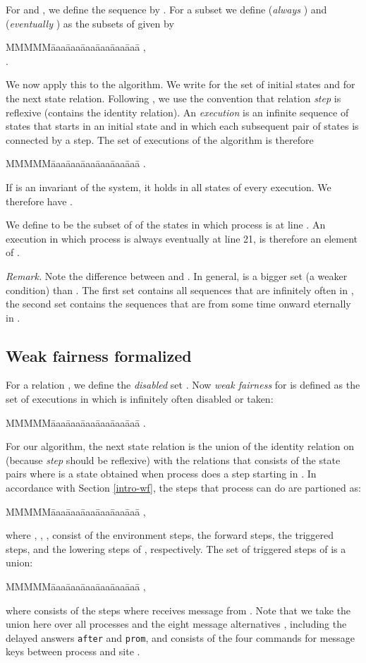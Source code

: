 \documentclass[10pt]{article} \usepackage[english]{babel}
\newenvironment{tab}{\begin{tabbing}
MMMMM\=aaa\=aaa\=aaa\=aaa\=aaa\=aaa\= \kill}{\end{tabbing}}
\newenvironment{remark}{\medbreak\noindent\emph{Remark.}}{\boks}
\def\boks  {\mbox{}}
\def\S #1/{\mbox {\textsl{#1}}}
\def\T #1/{\mbox {\texttt{#1}}}
\begin{document}
For  and , we define the sequence  by .  For a
subset  we define  (\emph{always} )
and  (\emph{eventually} ) as the subsets of 
given by
\begin{tab}
\>   ,\\
\>   .
\end{tab}

We now apply this to the algorithm.  We write 
for the set of initial states and  for the next
state relation. Following \cite{AbL91}, we use the convention that
relation \S step/ is reflexive (contains the identity relation).  An
\emph{execution} is an infinite sequence of states that starts in an
initial state and in which each subsequent pair of states is connected
by a step. The set of executions of the algorithm is therefore
\begin{tab}
\>  .
\end{tab}

If  is an invariant of the system, it holds in all states of every
execution. We therefore have .

We define  to be the subset of  of the states in
which process  is at line . An execution in which process 
is always eventually at line 21, is therefore an element of
.  

\begin{remark} Note the difference between  and
  .  In general,  is a
  bigger set (a weaker condition) than . The
  first set contains all sequences that are infinitely often in ,
  the second set contains the sequences that are from some time onward
  eternally in .  
\end{remark}

\subsection{Weak fairness formalized} 
\label{inf_live}

For a relation , we define the \emph{disabled} set
. Now \emph{weak fairness}
\cite{Lam94} for  is defined as the set of executions in which
 is infinitely often  disabled or taken:
\begin{tab}
\>  .
\end{tab}

For our algorithm, the next state relation  is
the union of the identity relation on  (because \S step/ should be
reflexive) with the relations  that consists of the state
pairs  where  is a state obtained when process  does a
step starting in .  In accordance with Section \ref{intro-wf}, the
steps that process  can do are partioned as:
\begin{tab}
\>  ,
\end{tab}
where , , ,  consist
of the environment steps, the forward steps, the triggered steps, and
the lowering steps of , respectively.  The set of triggered steps
of  is a union:
\begin{tab}
\>  , 
\end{tab}
where  consists of the steps where  receives
message  from . Note that we take the union here over all
processes  and the eight message alternatives , including the
delayed answers \T after/ and \T prom/, and  consists
of the four commands for message keys  between process  and site
.
\end{document}
